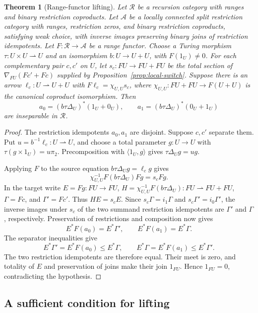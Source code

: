 \documentclass[11pt]{article}
\newtheorem{theorem}{Theorem}[section]
\begin{document}
\begin{theorem}[Range-functor lifting]\label{thm:local-lifting}
Let $\mathscr R$ be a recursion category with ranges and
binary restriction coproducts. Let $\mathcal A$ be a locally connected
split restriction category with ranges, restriction zeros, and binary
restriction coproducts, satisfying weak choice, with inverse images
preserving binary joins of restriction idempotents. Let
$F:\mathscr R\to\mathcal A$ be a range functor.
Choose a Turing morphism $\tau:U\times U\rightharpoonup U$ and
an isomorphism $b:U\to U+U$, with $F(1_U)\ne0$.
For each complementary pair $c,c'$ on $U$, let
$s_c:FU\to FU+FU$ be the total section of $\nabla_{FU}(Fc'+Fc)$ supplied by
Proposition~\ref{prop:local-switch}. Suppose there is an arrow
$\ell_c:U\rightharpoonup U+U$ with
$F\ell_c=\chi_{U,U}s_c$, where
$\chi_{U,U}:FU+FU\to F(U+U)$ is the canonical coproduct isomorphism.
Then
\[
 a_0=(b\tau\Delta_U)^*(1_U+0_U),\qquad
 a_1=(b\tau\Delta_U)^*(0_U+1_U)
\]
are inseparable in $\mathscr R$.
\end{theorem}
\begin{proof}
The restriction idempotents $a_0,a_1$ are disjoint. Suppose $c,c'$ separate them.
Put $u=b^{-1}\ell_c:U\rightharpoonup U$, and choose a total parameter $g:U\to U$ with
$\tau(g\times1_U)=u\pi_2$. Precomposition with $\langle1_U,g\rangle$
gives $\tau\Delta_Ug=ug$.

Applying $F$ to the source equation
$b\tau\Delta_Ug=\ell_cg$ gives
\[
 \chi_{U,U}^{-1}F(b\tau\Delta_U)Fg=s_cFg.
\]
In the target write $E=Fg:FU\to FU$,
$H=\chi_{U,U}^{-1}F(b\tau\Delta_U):FU\rightharpoonup FU+FU$,
$\Gamma=Fc$, and $\Gamma'=Fc'$. Thus $HE=s_cE$.
Since $s_c\Gamma=i_1\Gamma$ and $s_c\Gamma'=i_0\Gamma'$,
the inverse images under $s_c$ of the two summand restriction idempotents are
$\Gamma'$ and $\Gamma$,
respectively. Preservation of restrictions and composition now gives
\[
 E^*F(a_0)=E^*\Gamma',\qquad E^*F(a_1)=E^*\Gamma.
\]
The separator inequalities give
\[
 E^*\Gamma'=E^*F(a_0)\le E^*\Gamma,
 \qquad E^*\Gamma=E^*F(a_1)\le E^*\Gamma'.
\]
The two restriction idempotents are therefore equal. Their meet is
zero, and totality of $E$ and preservation of joins make their join
$1_{FU}$. Hence $1_{FU}=0$, contradicting the hypothesis.
\end{proof}

\subsection{A sufficient condition for lifting}
\end{document}

